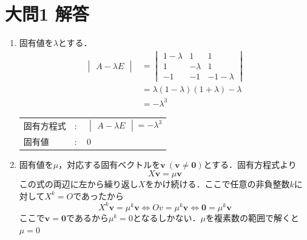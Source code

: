 \documentclass[dvipdfmx]{jsreport}
\begin{document}
\section{大問1 解答}
\begin{souanswer} %
\begin{enumerate}
	\item 固有値を$\lambda$とする．
\begin{align*}
	\begin{vmatrix}A- \lambda E\end{vmatrix}
&= 
\begin{vmatrix}
	1- \lambda& 1& 1\\
	1& -\lambda& 1\\
	-1& -1& -1- \lambda
\end{vmatrix}\\
&= \lambda(1- \lambda)(1+ \lambda)- \lambda\\
&= -\lambda^3
\end{align*}
\begin{tabular}{lll}
	固有方程式& $\colon$& $\begin{vmatrix}A- \lambda E\end{vmatrix}= -\lambda^3$\\
	固有値& $\colon$& 0
\end{tabular}
	\item 固有値を$\mu$，対応する固有ベクトルを$\bm{v}\ (\bm{v}\ne \bm{0})$とする．固有方程式より
\begin{equation*}
	X\bm{v} = \mu \bm{v}
\end{equation*}
	この式の両辺に左から繰り返し$X$をかけ続ける．ここで任意の非負整数$k$に対して$X^k= O$であったから
\begin{equation*}
	X^k\bm{v}= \mu^k \bm{v}\iff Ov= \mu^k \bm{v}\iff \bm{0}= \mu^k \bm{v}
\end{equation*}
	ここで$\bm{v}= \bm{0}$であるから$\mu^k= 0$となるしかない．$\mu$を複素数の範囲で解くと$\mu= 0$
\end{enumerate}
\end{souanswer}
\end{document}

